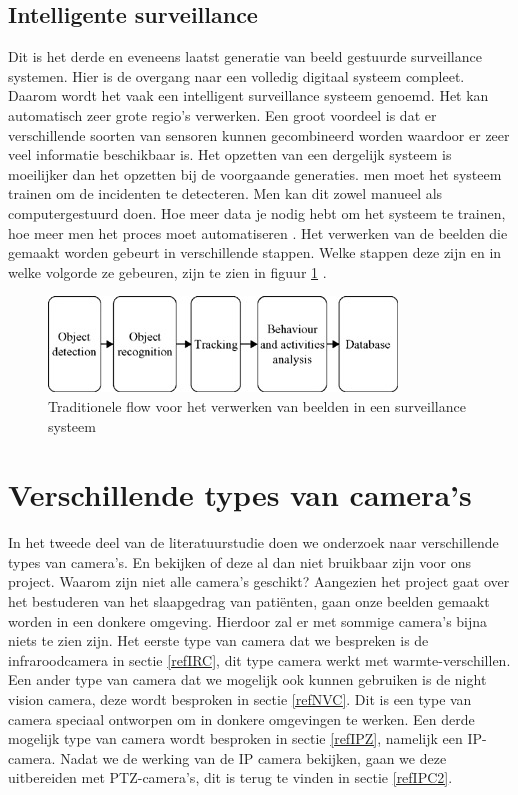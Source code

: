 \subsection{Intelligente surveillance}
\label{refINS}
Dit is het derde en eveneens laatst generatie van beeld gestuurde surveillance systemen. Hier is de overgang naar een volledig digitaal systeem compleet\cite{bibVTC2}. Daarom wordt het vaak een intelligent surveillance systeem genoemd. Het kan automatisch zeer grote regio's verwerken. Een groot voordeel is dat er verschillende soorten van sensoren kunnen gecombineerd worden waardoor er zeer veel informatie beschikbaar is. Het opzetten van een dergelijk systeem is moeilijker dan het opzetten bij de voorgaande generaties. men moet het systeem trainen om de incidenten te detecteren. Men  kan dit zowel manueel als computergestuurd doen. Hoe meer data je nodig hebt om het systeem te trainen, hoe meer men het proces moet automatiseren \cite{bibVTS}. Het verwerken van de beelden die gemaakt worden gebeurt in verschillende stappen.  Welke stappen deze zijn en in welke volgorde ze gebeuren, zijn te zien in figuur \ref{imgVTS} \cite{bibIPC2}.
\begin{figure}[hbp]
	\includegraphics[scale=0.8]{FlowSurveillance}
	\caption{Traditionele flow voor het verwerken van beelden in een surveillance systeem}
	\label{imgVTS}
\end{figure}

\section{Verschillende types van camera's}
\label{refTVC}
In het tweede deel van de literatuurstudie doen we onderzoek naar verschillende types van camera's. En bekijken of deze al dan niet bruikbaar zijn voor ons project. Waarom zijn niet alle camera's geschikt? Aangezien het project gaat over het bestuderen van het slaapgedrag van pati\"enten, gaan onze beelden gemaakt worden in een donkere omgeving. Hierdoor zal er met sommige camera's bijna niets te zien zijn. Het eerste type van camera dat we bespreken is de infraroodcamera in sectie \ref{refIRC}, dit type camera werkt met warmte-verschillen. Een ander type van camera dat we mogelijk ook kunnen gebruiken is  de night vision camera, deze wordt besproken in sectie \ref{refNVC}. Dit is een type van camera speciaal ontworpen om in donkere omgevingen te werken. Een derde mogelijk type van camera wordt besproken in sectie \ref{refIPZ}, namelijk een IP-camera. Nadat we de werking van de IP camera bekijken, gaan we deze uitbereiden met PTZ-camera's, dit is terug te vinden in sectie \ref{refIPC2}.

